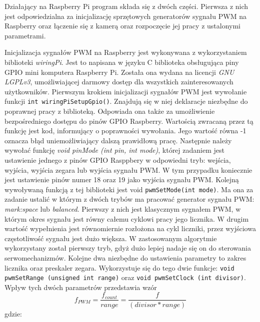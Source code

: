 Działający na Raspberry Pi program składa się z dwóch części. Pierwsza z nich jest odpowiedzialna za inicjalizację sprzętowych generatorów sygnału PWM na Raspberry oraz łączenie się z kamerą oraz rozpoczęcie jej pracy z ustalonymi parametrami.

Inicjalizacja sygnałów PWM na Raspberry jest wykonywana z wykorzystaniem biblioteki \textit{wiringPi}. Jest to napisana w języku C biblioteka obsługująca piny GPIO mini komputera Raspberry Pi. Została ona wydana na licencji \textit{GNU LGPLv3}, umożliwiającej darmowy dostęp dla wszystkich zainteresowanych użytkowników. Pierwszym krokiem inicjalizacji sygnałów PWM jest wywołanie funkcji \texttt{int wiringPiSetupGpio()}. Znajdują się w niej deklaracje niezbędne do poprawnej pracy z biblioteką. Odpowiada ona także za umożliwienie bezpośredniego dostępu do pinów GPIO Raspberry. Wartością zwracaną przez tą funkcję jest kod, informujący o poprawności wywołania. Jego wartość równa -1 oznacza błąd uniemożliwiający dalszą prawidłową pracę. Następnie należy wywołać funkcję \textit{void pinMode (int pin, int mode)}, której zadaniem jest ustawienie jednego z pinów GPIO Rasppbery w odpowiedni tryb: wejścia, wyjścia, wyjścia zegara lub wyjścia sygnału PWM. W tym przypadku koniecznie jest ustawienie pinów numer 18 oraz 19 jako wyjścia sygnału PWM. Kolejną wywoływaną funkcją z tej biblioteki jest void \texttt{pwmSetMode(int mode)}. Ma ona za zadanie ustalić w którym z dwóch trybów ma pracować generator sygnału PWM: \textit{mark:space} lub \textit{balanced}. Pierwszy z nich jest klasycznym sygnałem PWM, w którym okres sygnału jest równy całemu cyklowi pracy jego licznika. W drugim wartość wypełnienia jest równomiernie rozłożona na cykl liczniki, przez wyjściowa częstotliwość sygnału jest dużo większa. W zastosowanym algorytmie wykorzystany został pierwszy tryb, gdyż dużo lepiej nadaje się on do sterowania serwomechanizmów. Kolejne dwa niezbędne do ustawienia parametry to zakres licznika oraz preskaler zegara. Wykorzystuje się do tego dwie funkcje: \texttt{void pwmSetRange (unsigned int range)} oraz \texttt{void pwmSetClock (int divisor)}. Wpływ tych dwóch parametrów przedstawia wzór
\begin{equation}
f_{PWM} = \frac{f_{count}}{range} = \frac{f}{(divisor * range)}
\label{eq:hard_pwm}
\end{equation}
gdzie:
\begin{equationDescriptor}
\end{equationDescriptor}
